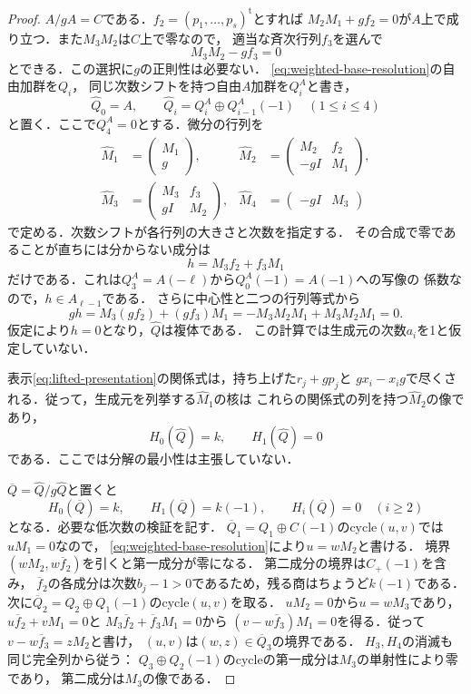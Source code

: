 \documentclass[11pt,a4paper]{ltjsarticle}
\theoremstyle{definition}
\begin{document}
\begin{proof}
$A/gA=C$である．$f_2=(p_1,\ldots,p_s)^{\mathrm t}$とすれば
$M_2M_1+gf_2=0$が$A$上で成り立つ．また$M_3M_2$は$C$上で零なので，
適当な斉次行列$f_3$を選んで
\[
 M_3M_2-gf_3=0
\]
とできる．この選択に$g$の正則性は必要ない．
\eqref{eq:weighted-base-resolution}の自由加群を$Q_i$，
同じ次数シフトを持つ自由$A$加群を$Q_i^A$と書き，
\[
 \widehat Q_0=A,\qquad
 \widehat Q_i=Q_i^A\oplus Q_{i-1}^A(-1)\quad(1\leq i\leq4)
\]
と置く．ここで$Q_4^A=0$とする．微分の行列を
\begin{align*}
 \widehat M_1&=\begin{pmatrix}M_1\\g\end{pmatrix},&
 \widehat M_2&=\begin{pmatrix}M_2&f_2\\-gI&M_1\end{pmatrix},\\
 \widehat M_3&=\begin{pmatrix}M_3&f_3\\gI&M_2\end{pmatrix},&
 \widehat M_4&=\begin{pmatrix}-gI&M_3\end{pmatrix}
\end{align*}
で定める．次数シフトが各行列の大きさと次数を指定する．
その合成で零であることが直ちには分からない成分は
\[
 h=M_3f_2+f_3M_1
\]
だけである．これは$Q_3^A=A(-\ell)$から$Q_0^A(-1)=A(-1)$への写像の
係数なので，$h\in A_{\ell-1}$である．
さらに中心性と二つの行列等式から
\[
 gh=M_3(gf_2)+(gf_3)M_1
   =-M_3M_2M_1+M_3M_2M_1=0.
\]
仮定により$h=0$となり，$\widehat Q$は複体である．
この計算では生成元の次数$a_i$を1と仮定していない．

表示\eqref{eq:lifted-presentation}の関係式は，持ち上げた$r_j+gp_j$と
$gx_i-x_ig$で尽くされる．従って，生成元を列挙する$\widehat M_1$の核は
これらの関係式の列を持つ$\widehat M_2$の像であり，
\begin{equation}\label{eq:lifted-low-homology}
 H_0(\widehat Q)=k,\qquad H_1(\widehat Q)=0
\end{equation}
である．ここでは分解の最小性は主張していない．

$\overline Q=\widehat Q/g\widehat Q$と置くと
\begin{equation}\label{eq:reduced-homology}
 H_0(\overline Q)=k,\qquad
 H_1(\overline Q)=k(-1),\qquad
 H_i(\overline Q)=0\quad(i\geq2)
\end{equation}
となる．必要な低次数の検証を記す．
$\overline Q_1=Q_1\oplus C(-1)$のcycle$(u,v)$では$uM_1=0$なので，
\eqref{eq:weighted-base-resolution}により$u=wM_2$と書ける．
境界$(wM_2,w\overline f_2)$を引くと第一成分が零になる．
第二成分の境界は$C_+(-1)$を含み，
$\overline f_2$の各成分は次数$b_j-1>0$であるため，残る商はちょうど$k(-1)$である．
次に$\overline Q_2=Q_2\oplus Q_1(-1)$のcycle$(u,v)$を取る．
$uM_2=0$から$u=wM_3$であり，
$u\overline f_2+vM_1=0$と
$M_3\overline f_2+\overline f_3M_1=0$から
$(v-w\overline f_3)M_1=0$を得る．従って
$v-w\overline f_3=zM_2$と書け，
$(u,v)$は$(w,z)\in\overline Q_3$の境界である．
$H_3,H_4$の消滅も同じ完全列から従う：
$Q_3\oplus Q_2(-1)$のcycleの第一成分は$M_3$の単射性により零であり，
第二成分は$M_3$の像である．


\end{proof}
\end{document}
